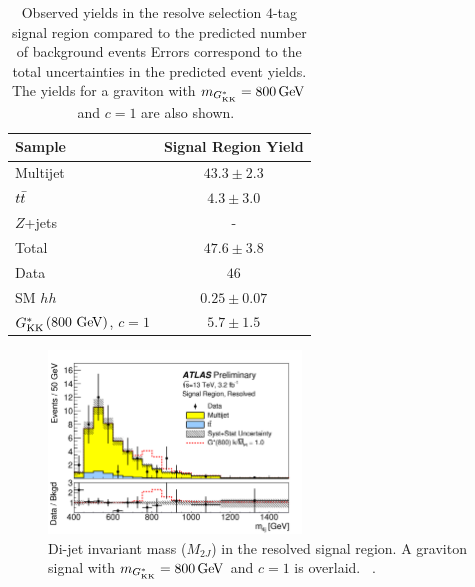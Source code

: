 \begin{table}[!ht]
\begin{center}
\begin{tabular}{ l c  }
\toprule
 Sample      & Signal Region Yield \\ 
\midrule
Multijet     & $43.3 \pm 2.3$   \\
$t\bar{t}$       &  $4.3 \pm 3.0$   \\
$Z$+jets     &  -           \\
\midrule
Total        & $47.6 \pm 3.8$   \\
 \midrule
Data         & $46$    \\
\midrule
SM $hh$ & $0.25 \pm 0.07$ \\
$G^*_{\rm KK}$$\left(800\,\rm{\GeV}\right)$, $c = 1$ & $5.7 \pm 1.5$ \\
\bottomrule
\end{tabular}
\caption{Observed yields in the resolve selection $4$-tag signal region compared to the predicted number of background events
  Errors correspond to the total uncertainties in the predicted event yields. The yields for a graviton with $m_{\Gkk} = 800\GeV$ and $c = 1$ are also shown.~\cite{4bconf}}
\label{tab:ResolvedResults} 
\end{center}
\end{table}

\begin{figure}[h!]
  \centering
  \captionsetup{justification=centering}

  \includegraphics[width=0.6\textwidth]{figures/Resolved_signal}


   \caption{Di-jet invariant mass ($M_{2J}$) in the resolved signal region. A graviton signal with $m_{\Gkk} = 800 \GeV$ and $c=1$ is overlaid. ~\cite{4bconf}.}
  \label{fig:ResolvedResults}
\end{figure}

